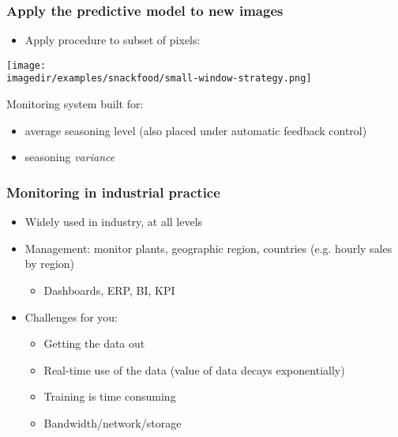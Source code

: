 \begin{frame}\frametitle{Apply the predictive model to new images {\color{myOrange}{(phase 2)}}}
	
	\begin{itemize}
		\item	Apply procedure to subset of pixels:
	\end{itemize}
	\begin{center}
		\texttt{[image: \\imagedir/examples/snackfood/small-window-strategy.png]}
	\end{center}
	Monitoring system built for:
	\begin{itemize}
		\item	average seasoning level {\small (also placed under automatic feedback control)}
		\item	seasoning \emph{variance}
	\end{itemize}
\end{frame}

\begin{frame}\frametitle{Monitoring in industrial practice}
	\begin{itemize}
		\item	Widely used in industry, at all levels
		\item	Management: monitor plants, geographic region, countries (e.g. hourly sales by region)
		\begin{itemize}
			\item	Dashboards, ERP, BI, KPI
		\end{itemize}
	\end{itemize}
	\begin{itemize}
		\item	Challenges for you:
		\begin{itemize}
			\item	Getting the data out
			\item	Real-time use of the data (value of data decays exponentially)
			\item	Training is time consuming
			\item	Bandwidth/network/storage
		\end{itemize}
	\end{itemize}
\end{frame}

